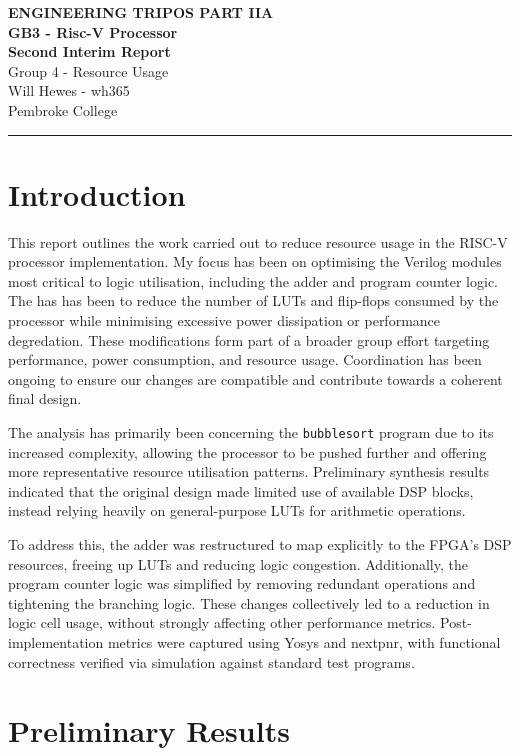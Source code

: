 \documentclass[a4paper,10pt]{article}
\renewcommand{\maketitle}{
    \begin{center}
        \LARGE \textbf{ENGINEERING TRIPOS PART IIA} \\ 
        \vspace{0.5em}
        \Large \textbf{GB3 - Risc-V Processor} \\ 
        \vspace{0.5em}
        \textbf{Second Interim Report} \\
        \large Group 4 - Resource Usage \\
        \vspace{1em}
        \large Will Hewes - wh365 \\ 
        Pembroke College \\ 
        \vspace{0.5em}
    \end{center}
}
\begin{document}

\maketitle
\hrule
\tableofcontents
\newpage

\section{Introduction}
\label{sec:Introduction}

This report outlines the work carried out to reduce resource usage 
in the RISC-V processor implementation. 
My focus has been on optimising the Verilog modules 
most critical to logic utilisation, including the adder and program counter logic. 
The has has been to reduce the number of LUTs and flip-flops consumed
by the processor while minimising 
excessive power dissipation or performance degredation.
These modifications form part of a broader group effort targeting performance, 
power consumption, and resource usage. 
Coordination has been ongoing to ensure our changes are compatible and 
contribute towards a coherent final design.

The analysis has primarily been concerning the
\texttt{bubblesort} program due to its increased complexity,
allowing the processor to be pushed further and 
offering more representative resource utilisation patterns.
Preliminary synthesis results indicated that the original design 
made limited use of available DSP blocks, 
instead relying heavily on general-purpose LUTs for arithmetic operations.

To address this, the adder was restructured to map explicitly 
to the FPGA's DSP resources, freeing up LUTs and reducing logic congestion.
Additionally, the program counter logic was simplified 
by removing redundant operations and tightening the branching logic.
These changes collectively led to a reduction in logic cell usage, 
without strongly affecting other performance metrics.
Post-implementation metrics were captured using Yosys and nextpnr, 
with functional correctness verified via simulation against standard test programs.


\section{Preliminary Results}
\label{sec:Preliminary_Results}
\end{document}
